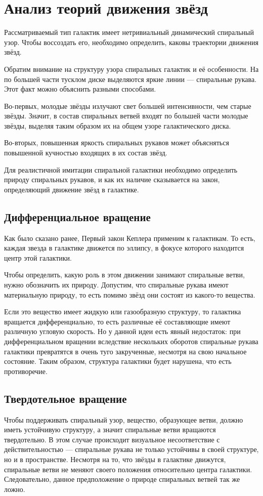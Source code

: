 \section{Анализ теорий движения звёзд}
Рассматриваемый тип галактик имеет нетривиальный динамический спиральный узор. Чтобы воссоздать его, необходимо определить, каковы траектории движения звёзд.

Обратим внимание на структуру узора спиральных галактик и её особенности. На по большей части тусклом диске выделяются яркие линии — спиральные рукава. Этот факт можно объяснить разными способами.

Во-первых, молодые звёзды излучают свет большей интенсивности, чем старые звёзды. Значит, в состав спиральных ветвей входят по большей части молодые звёзды, выделяя таким образом их на общем узоре галактического диска.

Во-вторых, повышенная яркость спиральных рукавов может объясняться повышенной кучностью входящих в их состав звёзд.

Для реалистичной имитации спиральной галактики необходимо определить природу спиральных рукавов, и как их наличие сказывается на закон, определяющий движение звёзд в галактике.

\subsection{Дифференциальное вращение}

Как было сказано ранее, Первый закон Кеплера применим к галактикам. То есть, каждая звезда в галактике движется по эллипсу, в фокусе которого находится центр этой галактики.

Чтобы определить, какую роль в этом движении занимают спиральные ветви, нужно обозначить их природу. Допустим, что спиральные рукава имеют материальную природу, то есть помимо звёзд они состоят из какого-то вещества.

Если это вещество имеет жидкую или газообразную структуру, то галактика вращается дифференциально, то есть различные её составляющие имеют различную угловую скорость. Но у данной идеи есть явный недостаток: при дифференциальном вращении вследствие нескольких оборотов спиральные рукава галактики превратятся в очень туго закрученные, несмотря на свою начальное состояние. Таким образом, структура галактики будет нарушена, что есть противоречие.

\subsection{Твердотельное вращение}
Чтобы поддерживать спиральный узор, вещество, образующее ветви, должно иметь устойчивую структуру, а значит спиральные ветви вращаются твердотельно. В этом случае происходит визуальное несоответствие с действительностью — спиральные рукава не только устойчивы в своей структуре, но и в пространстве. Несмотря на то, что звёзды в галактике движутся, спиральные ветви не меняют своего положения относительно центра галактики. Следовательно, данное предположение о природе спиральных ветвей так же ложно.

